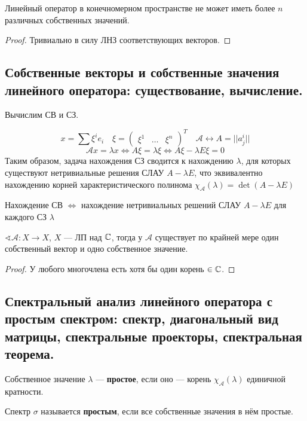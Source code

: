 \begin{lemma}
    Линейный оператор в конечномерном пространстве не может иметь более $n$ различных собственных значений.
\end{lemma}
\begin{proof}
    Тривиально в силу ЛНЗ соответствующих векторов.
\end{proof}

\subsection{Собственные векторы и собственные значения линейного оператора: существование, вычисление. }

Вычислим СВ и СЗ.

$$x = \sum \xi^i e_i \quad \xi = \begin{pmatrix}
    \xi^1 & \ldots & \xi^n
\end{pmatrix}^T \quad \mathcal A \leftrightarrow A = ||a^i_j||$$
$$\mathcal A x = \lambda x \Leftrightarrow A \xi = \lambda \xi \Leftrightarrow A \xi - \lambda E \xi = 0$$
Таким образом, задача нахождения СЗ сводится к нахождению $\lambda$, для которых существуют нетривиальные решения СЛАУ $A-\lambda E$, что эквивалентно нахождению корней характеристического полинома $\chi_{\mathcal A}(\lambda) = \det(A - \lambda E)$

Нахождение СВ $\Leftrightarrow$ нахождение нетривиальных решений СЛАУ $A - \lambda E$ для каждого СЗ $\lambda$     

\begin{lemma}
    $\sphericalangle \mathcal A : X \to X$, $X$ --- ЛП над $\mathbb{C}$, тогда у $\mathcal A$ существует по крайней мере один собственный вектор и одно собственное значение.    
\end{lemma}
\begin{proof}
    У любого многочлена есть хотя бы один корень $\in \mathbb{C}$.
\end{proof}

\subsection{Спектральный анализ линейного оператора с простым спектром: спектр, диагональный вид матрицы, спектральные проекторы, спектральная теорема.}
\begin{definition}
    Собственное значение $\lambda$ --- \textbf{простое}, если оно --- корень $\chi_{\mathcal A}(\lambda)$ единичной кратности.
\end{definition}
\begin{definition}
    Спектр $\sigma$ называется \textbf{простым}, если все собственные значения в нём простые.
\end{definition}

